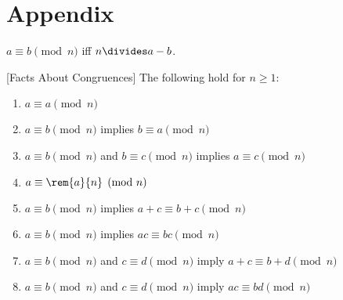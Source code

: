 \documentclass[handout]{mcs}
\begin{document}



\instatements{\newpage}

\section*{Appendix}

\iffalse
\begin{lemma}\label{mn}
Let $p_1,p_2,\dots,p_k$ be the unique factorization of an integer $n>1$
into primes.  That is, $p_1,p_2,\dots,p_k$ is a weakly increasing sequence
of primes and
\[
n = p_1 \cdot p_2\cdots p_k.
\]
If $m \divides n$ and $m>1$, then the unique factorization of
$m$ is a subsequence $p_{i_1},p_{i_2},\dots,p_{i_m}$ where $1 \leq i_1 < i_2 <
\cdots i_j \leq k$.
\end{lemma}
\fi

\begin{definition*}
$a \equiv b \pmod{n}$ iff $n \divides a-b$.
\end{definition*}
 
\begin{lemma}\label{facts} [Facts About Congruences]  The following  hold for 
$n \geq 1$:
%
\begin{enumerate}
\item $a \equiv a \pmod{n}$
\item $a \equiv b \pmod{n}$ implies $b \equiv a \pmod{n}$
\item $a \equiv b \pmod{n}$ and $b \equiv c \pmod{n}$ implies $a \equiv c \pmod{n}$
\item\label{cp8m.aran} $a \equiv \rem{a}{n} \pmod{n}$
\item $a \equiv b \pmod{n}$ implies $a + c \equiv b + c \pmod{n}$
\item $a \equiv b \pmod{n}$ implies $a c \equiv b c \pmod{n}$
\item $a \equiv b \pmod{n}$ and $c \equiv d \pmod{n}$ imply $a + c
\equiv b + d \pmod{n}$
\item $a \equiv b \pmod{n}$ and $c \equiv d \pmod{n}$ imply $a c
\equiv b d \pmod{n}$
\end{enumerate}
\end{lemma}
\end{document}
